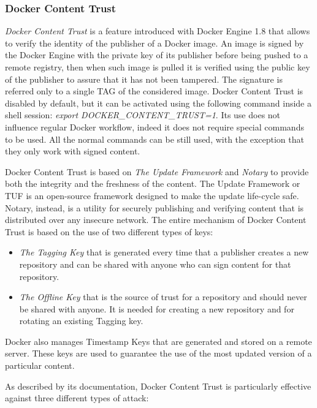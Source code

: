 \documentclass[a4paper,12pt]{article}
\begin{document}
\subsubsection{Docker Content Trust}

\textit{Docker Content Trust} \cite{docker_content_trust} is a feature
introduced with Docker Engine 1.8 that allows to verify the identity of the
publisher of a Docker image. An image is signed by the Docker Engine with the
private key of its publisher before being pushed to a remote registry, then when
such image is pulled it is verified using the public key of the publisher to
assure that it has not been tampered. The signature is referred only to a single
TAG of the considered image. Docker Content Trust is disabled by default, but it
can be activated using the following command inside a shell session:
\textit{export DOCKER\_CONTENT\_TRUST=1}. Its use does not influence regular
Docker workflow, indeed it does not require special commands to be used. All the
normal commands can be still used, with the exception that they only work with
signed content. \par Docker Content Trust is based on \textit{The Update
Framework} and \textit{Notary} to provide both the integrity and the freshness
of the content. The Update Framework or TUF is an open-source framework designed
to make the update life-cycle safe. Notary, instead, is a utility for securely
publishing and verifying content that is distributed over any insecure network.
The entire mechanism of Docker Content Trust is based on the use of two
different types of keys: 
\begin{itemize}
  \item \textit{The Tagging Key} that is generated every time that a publisher
  creates a new repository and can be shared with anyone who can sign content
  for that repository. 
  \item \textit{The Offline Key} that is the source of trust for a repository
  and should never be shared with anyone. It is needed for creating a new
  repository and for rotating an existing Tagging key. 
\end{itemize}
Docker also manages Timestamp Keys that are generated and stored on a remote
server. These keys are used to guarantee the use of the most updated version of
a particular content. \par As described by its documentation, Docker Content
Trust is particularly effective against three different types of attack:
\end{document}
